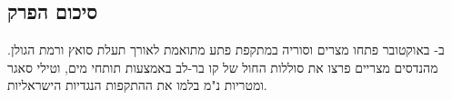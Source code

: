 \bigskip
\begin{otherlanguage}{hebrew}
\subsection*{סיכום הפרק}

ב-{\endL} באוקטובר {\endL} פתחו מצרים וסוריה במתקפת פתע מתואמת לאורך תעלת סואץ ורמת הגולן. מהנדסים מצריים פרצו את סוללות החול של קו בר-לב באמצעות תותחי מים, וטילי סאגר ומטריות נ"מ בלמו את ההתקפות הנגדיות הישראליות.

\end{otherlanguage}

\clearpage
